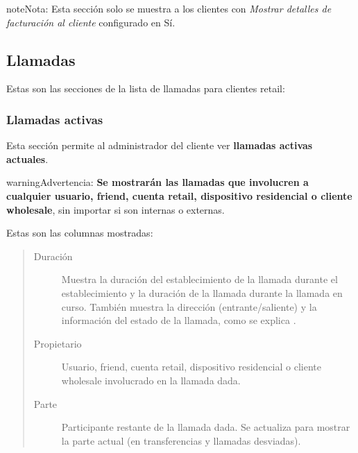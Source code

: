 \documentclass[letterpaper,10pt,spanish]{sphinxmanual}
\begin{document}
\begin{notice}{note}{Nota:}
Esta sección solo se muestra a los clientes con \emph{Mostrar detalles de facturación al cliente} configurado en Sí.
\end{notice}


\subsection{Llamadas}
\label{administration_portal/client/retail/calls/index::doc}\label{administration_portal/client/retail/calls/index:calls}
Estas son las secciones de la lista de llamadas para clientes retail:


\subsubsection{Llamadas activas}
\label{administration_portal/client/retail/calls/active_calls::doc}\label{administration_portal/client/retail/calls/active_calls:active-calls}
Esta sección permite al administrador del cliente ver \textbf{llamadas activas actuales}.

\begin{notice}{warning}{Advertencia:}
\textbf{Se mostrarán las llamadas que involucren a cualquier usuario, friend, cuenta retail, dispositivo residencial o cliente wholesale}, sin importar si son internas o externas.
\end{notice}

Estas son las columnas mostradas:
\begin{quote}
\begin{description}
\item[{Duración}] \leavevmode
Muestra la duración del establecimiento de la llamada durante el establecimiento y la duración de la llamada durante la llamada en curso. También muestra la dirección (entrante/saliente) y la información del estado de la llamada, como se explica {\hyperref[administration_portal/platform/active_calls:call\string-state]{}}.

\item[{Propietario}] \leavevmode
Usuario, friend, cuenta retail, dispositivo residencial o cliente wholesale involucrado en la llamada dada.

\item[{Parte}] \leavevmode
Participante restante de la llamada dada. Se actualiza para mostrar la parte actual (en transferencias y llamadas desviadas).

\end{description}
\end{quote}
\end{document}
